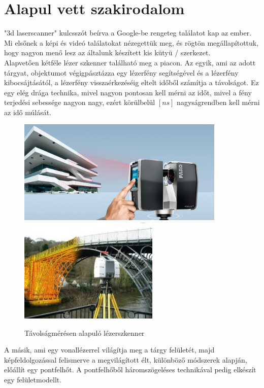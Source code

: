 \documentclass[12pt,a4paper]{article}
\begin{document}
\section{Alapul vett szakirodalom} %
	"3d laserscanner" kulcsszót beírva a Google-be rengeteg találatot kap az ember. Mi elsőnek a képi és videó találatokat nézegettük meg, és rögtön megállapítottuk, hogy nagyon menő lesz az általunk készített kis kütyü / szerkezet.\\
	
	Alapvetően kétféle lézer szkenner található meg a piacon. Az egyik, ami az adott tárgyat, objektumot végigpásztázza egy lézerfény segítségével és a lézerfény kibocsájtásától, a lézerfény visszaérkezéséig eltelt időből számítja a távolságot. Ez egy elég drága technika, mivel nagyon pontosan kell mérni az időt, mivel a fény terjedési sebessége nagyon nagy, ezért körülbelül $[ns]$ nagyságrendben kell mérni az idő múlását.
	\\
	\begin{figure}[h!]
		\begin{center}
			\includegraphics[height=5cm]{images/Faro_Building_Scan.jpg}
			\includegraphics[height=5cm]{images/Bridge_Scan.jpg}
		\end{center}
		\caption{Távolságmérésen alapuló lézerszkenner\cite{FaroBuildingScan}\cite{BridgeScan}}
	\end{figure}

	A másik, ami egy vonallézerrel világítja meg a tárgy felületét, majd képfeldolgozással felismerve a megvilágított élt, különböző módszerek alapján, előállít egy pontfelhőt. A pontfelhőből háromszögeléses technikával pedig elkészít egy felületmodellt.
	\\
	
\end{document}
